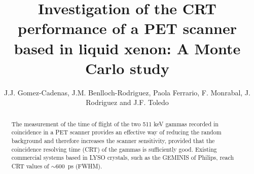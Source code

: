 \documentclass[review]{elsarticle}
\begin{document}
\begin{frontmatter}

\title{Investigation of the CRT performance of a PET scanner based in liquid xenon: A Monte Carlo study}


\author{J.J. Gomez-Cadenas, J.M. Benlloch-Rodriguez, Paola Ferrario, F. Monrabal, J. Rodriguez and J.F. Toledo}
\address{IFIC (U. Valencia/CSIC)}

%
%

\begin{abstract}
The measurement of the time of flight of the two 511 keV gammas recorded in coincidence in a PET scanner provides an effective way of reducing the random background and therefore increases the scanner sensitivity, provided that the coincidence resolving time (CRT) of the gammas is sufficiently good. Existing commercial systems based in LYSO crystals, such as the GEMINIS of Philips, reach CRT values of 
$\sim 600$~ps (FWHM). 



\end{abstract}
\end{frontmatter}
\end{document}
